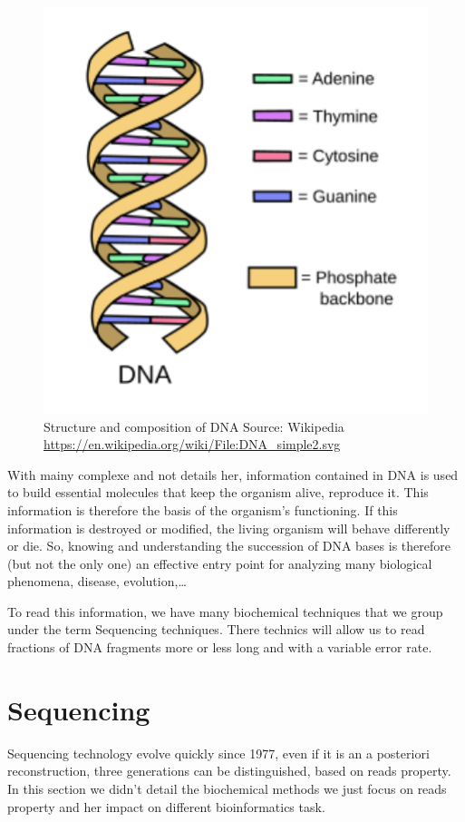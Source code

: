 \documentclass[./main.tex]{subfiles}
\begin{document}
\begin{figure}[ht]
    \centering
    \includegraphics[]{introduction/images/DNA.pdf}
    \caption{Structure and composition of DNA Source: Wikipedia \protect\url{https://en.wikipedia.org/wiki/File:DNA_simple2.svg}}
    \label{intro:fig:dna_rna_pres}
\end{figure}

With mainy complexe and not details her, information contained in DNA is used to build essential molecules that keep the organism alive, reproduce it. This information is therefore the basis of the organism's functioning. If this information is destroyed or modified, the living organism will behave differently or die. So, knowing and understanding the succession of DNA bases is therefore (but not the only one) an effective entry point for analyzing many biological phenomena, disease, evolution,…

To read this information, we have many biochemical techniques that we group under the term Sequencing techniques. There technics will allow us to read fractions of DNA fragments more or less long and with a variable error rate.

\section{Sequencing} \label{section:introduction:sequencing}

Sequencing technology evolve quickly since 1977\cite{sanger_sequencing}, even if it is an a posteriori reconstruction, three generations can be distinguished, based on reads property. In this section we didn't detail the biochemical methods we just focus on reads property and her impact on different bioinformatics task.
\end{document}
